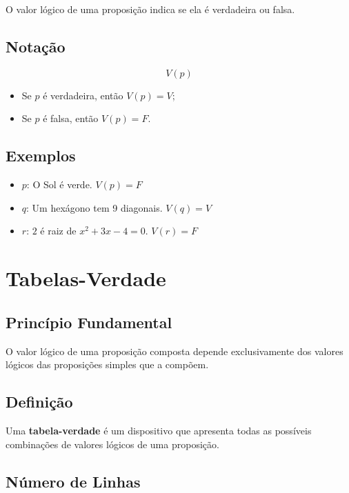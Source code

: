O valor lógico de uma proposição indica se ela é verdadeira ou falsa.

\subsection{Notação}

\[
V(p)
\]

\begin{itemize}
    \item Se $p$ é verdadeira, então $V(p) = V$;
    \item Se $p$ é falsa, então $V(p) = F$.
\end{itemize}

\subsection{Exemplos}

\begin{itemize}
    \item $p$: O Sol é verde. \hfill $V(p) = F$
    \item $q$: Um hexágono tem 9 diagonais. \hfill $V(q) = V$
    \item $r$: $2$ é raiz de $x^2 + 3x - 4 = 0$. \hfill $V(r) = F$
\end{itemize}

\section{Tabelas-Verdade}

\subsection{Princípio Fundamental}

O valor lógico de uma proposição composta depende exclusivamente dos valores lógicos das proposições simples que a compõem.

\subsection{Definição}

Uma \textbf{tabela-verdade} é um dispositivo que apresenta todas as possíveis combinações de valores lógicos de uma proposição.

\subsection{Número de Linhas}

